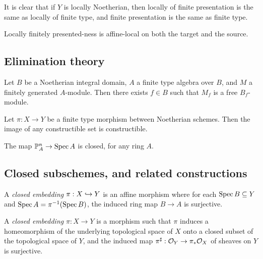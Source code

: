 \documentclass[11pt]{amsart}
\begin{document}
It is clear that if $Y$ is locally Noetherian, then locally of finite presentation is the same as locally of finite type, and finite presentation is the same as finite type.

\begin{prop}
Locally finitely presented-ness is affine-local on both the target and the source.
\end{prop}

\subsection{Elimination theory}

\begin{lem}
Let $B$ be a Noetherian integral domain, $A$ a finite type algebra over $B$, and $M$ a finitely generated $A$-module. Then there exists $f\in B$ such that $M_f$ is a free $B_f$-module.
\end{lem}

\begin{thm}
Let $\pi:X\to Y$ be a finite type morphism between Noetherian schemes. Then the image of any constructible set is constructible.
\end{thm}

\begin{thm}
The map $\mathbb{P}^n_A \to \operatorname{Spec} A$ is closed, for any ring $A$.
\end{thm}


\subsection{Closed subschemes, and related constructions}

\begin{defn}
    A \emph{closed embedding} $\pi:X\hookrightarrow Y$ is an affine morphism where for each $\operatorname{Spec} B\subseteq Y$ and $\operatorname{Spec} A = \pi^{-1}(\operatorname{Spec} B)$, the induced ring map $B\to A$ is surjective.
\end{defn}

\begin{defn}
    A \emph{closed embedding} $\pi:X\to Y$ is a morphism such that $\pi$ induces a homeomorphism of the underlying topological space of $X$ onto a closed subset of the topological space of $Y$, and the induced map $\pi^{\sharp}:\mathcal{O}_Y\to \pi_*\mathcal{O}_X$ of sheaves on $Y$ is surjective.    
\end{defn}
\end{document}
